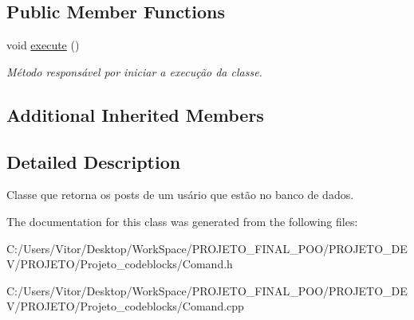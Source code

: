 \subsection*{Public Member Functions}
\begin{DoxyCompactItemize}
\item 
\hypertarget{class_command_find_user_post_a2a28fed7b287b88274b60d8e4524f6de}{void \hyperlink{class_command_find_user_post_a2a28fed7b287b88274b60d8e4524f6de}{execute} ()}\label{class_command_find_user_post_a2a28fed7b287b88274b60d8e4524f6de}

\begin{DoxyCompactList}\small\item\em Método responsável por iniciar a execução da classe. \end{DoxyCompactList}\end{DoxyCompactItemize}
\subsection*{Additional Inherited Members}


\subsection{Detailed Description}
Classe que retorna os posts de um usário que estão no banco de dados. 

The documentation for this class was generated from the following files\-:\begin{DoxyCompactItemize}
\item 
C\-:/\-Users/\-Vitor/\-Desktop/\-Work\-Space/\-P\-R\-O\-J\-E\-T\-O\-\_\-\-F\-I\-N\-A\-L\-\_\-\-P\-O\-O/\-P\-R\-O\-J\-E\-T\-O\-\_\-\-D\-E\-V/\-P\-R\-O\-J\-E\-T\-O/\-Projeto\-\_\-codeblocks/Comand.\-h\item 
C\-:/\-Users/\-Vitor/\-Desktop/\-Work\-Space/\-P\-R\-O\-J\-E\-T\-O\-\_\-\-F\-I\-N\-A\-L\-\_\-\-P\-O\-O/\-P\-R\-O\-J\-E\-T\-O\-\_\-\-D\-E\-V/\-P\-R\-O\-J\-E\-T\-O/\-Projeto\-\_\-codeblocks/Comand.\-cpp\end{DoxyCompactItemize}
